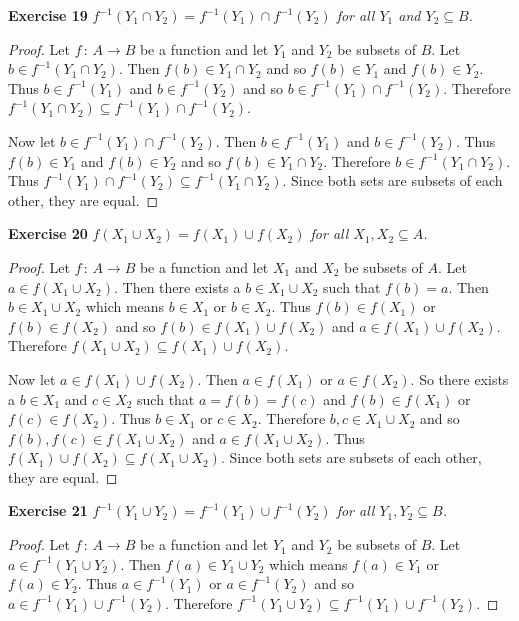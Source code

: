 \documentclass{article}
\begin{document}
\begin{flushleft}
\textbf{Exercise 19}
\textsl{$f^{-1}(Y_1 \cap Y_2) = f^{-1}(Y_1) \cap f^{-1}(Y_2)$ for all $Y_1$ and $Y_2 \subseteq B$.}
\begin{proof}
Let $f \, : \, A \rightarrow B$ be a function and let $Y_1$ and $Y_2$ be subsets of $B$. Let $b \in f^{-1}(Y_1 \cap Y_2)$. Then $f(b) \in Y_1 \cap Y_2$ and so $f(b) \in Y_1$ and $f(b) \in Y_2$. Thus $b \in f^{-1}(Y_1)$ and $b \in f^{-1}(Y_2)$ and so $b \in f^{-1}(Y_1) \cap f^{-1}(Y_2)$. Therefore $f^{-1}(Y_1 \cap Y_2) \subseteq f^{-1}(Y_1) \cap f^{-1}(Y_2)$.\newline

Now let $b \in f^{-1}(Y_1) \cap f^{-1}(Y_2)$. Then $b \in f^{-1}(Y_1)$ and $b \in f^{-1}(Y_2)$. Thus $ f(b) \in Y_1$ and $f(b) \in Y_2$ and so $f(b) \in Y_1 \cap Y_2$. Therefore $b \in f^{-1}(Y_1 \cap Y_2)$. Thus $f^{-1}(Y_1) \cap f^{-1}(Y_2) \subseteq f^{-1}(Y_1 \cap Y_2)$. Since both sets are subsets of each other, they are equal.
\end{proof}

\textbf{Exercise 20}
\textsl{$f (X_1 \cup X_2) = f(X_1) \cup f(X_2)$ for all $X_1, X_2 \subseteq A$.}
\begin{proof}
Let $f \, : \, A \rightarrow B$ be a function and let $X_1$ and $X_2$ be subsets of $A$. Let $a \in f (X_1 \cup X_2)$. Then there exists a $b \in X_1 \cup X_2$ such that $f(b)=a$. Then $b \in X_1 \cup X_2$ which means $b \in X_1$ or $b \in X_2$. Thus $f(b) \in f(X_1)$ or $f(b) \in f(X_2)$ and so $f(b) \in f(X_1) \cup f(X_2)$ and $a \in f(X_1) \cup f(X_2)$. Therefore $f (X_1 \cup X_2) \subseteq f(X_1) \cup f(X_2)$.\newline

Now let $a \in f(X_1) \cup f(X_2)$. Then $a \in f(X_1)$ or $a \in f(X_2)$. So there exists a $b \in X_1$ and $c \in X_2$ such that $a=f(b)=f(c)$ and $f(b) \in f(X_1)$ or $f(c) \in f(X_2)$. Thus $b \in X_1$ or $c \in X_2$. Therefore $b,c \in X_1 \cup X_2$ and so $f(b),f(c) \in f(X_1 \cup X_2)$ and $a \in f(X_1 \cup X_2)$. Thus $f(X_1) \cup f(X_2) \subseteq f(X_1 \cup X_2)$. Since both sets are subsets of each other, they are equal.
\end{proof}

\textbf{Exercise 21}
\textsl{$f^{-1} (Y_1 \cup Y_2) = f^{-1} (Y_1) \cup f^{-1} (Y_2)$ for all $Y_1, Y_2 \subseteq B$.}
\begin{proof}
Let $f \, : \, A \rightarrow B$ be a function and let $Y_1$ and $Y_2$ be subsets of $B$. Let $a \in f^{-1} (Y_1 \cup Y_2)$. Then $f(a) \in Y_1 \cup Y_2$ which means $f(a) \in Y_1$ or $f(a) \in Y_2$. Thus $a \in f^{-1} (Y_1)$ or $a \in f^{-1} (Y_2)$ and so $a \in f^{-1} (Y_1) \cup f^{-1} (Y_2)$. Therefore $f^{-1} (Y_1 \cup Y_2) \subseteq f^{-1} (Y_1) \cup f^{-1} (Y_2)$.\newline


\end{proof}
\end{flushleft}
\end{document}
